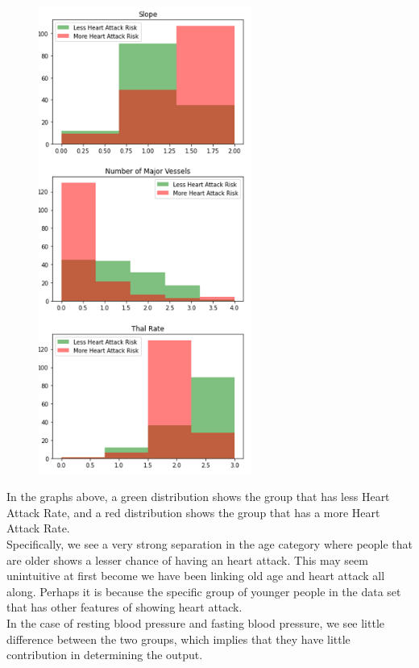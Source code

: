 \documentclass[11pt, oneside]{article}
\begin{document}
\begin{figure}[H]
    \includegraphics[width=7cm]{Corr5.png}
\end{figure}

In the graphs above, a green distribution shows the group that has less Heart Attack Rate, and a red distribution shows the group that has a more Heart Attack Rate. \\
Specifically, we see a very strong separation in the age category where people that are older shows a lesser chance of having an heart attack. This may seem unintuitive at first become we have been linking old age and heart attack all along. Perhaps it is because the specific group of younger people in the data set that has other features of showing heart attack.\\

In the case of resting blood pressure and fasting blood pressure, we see little difference between the two groups, which implies that they have little contribution in determining the output. \\
\end{document}
